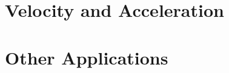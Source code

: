 \documentclass[12pt,fleqn]{book} %
\begin{document}

\section{Velocity and Acceleration}



\section{Other Applications}

\begin{center}

\end{center}

\vspace*{-3mm}

\pagebreak

\begin{center}

\end{center}
\end{document}
